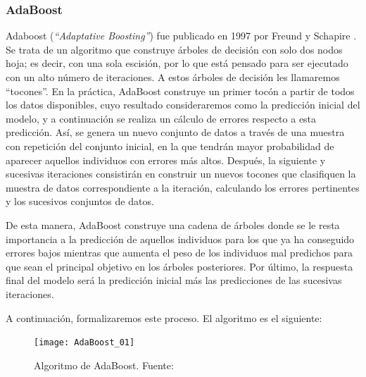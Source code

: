 \documentclass[12pt,twoside]{article}
\begin{document}
\subsubsection{AdaBoost} \label{sec:AdaBoost}
Adaboost (\textit{``Adaptative Boosting''}) fue publicado en 1997 por Freund y Schapire \cite{FR01}. Se trata de un algoritmo que construye árboles de decisión con solo dos nodos hoja; es decir, con una sola escisión, por lo que está pensado para ser ejecutado con un alto número de iteraciones. A estos árboles de decisión les llamaremos ``tocones''. En la práctica, AdaBoost construye un primer tocón a partir de todos los datos disponibles, cuyo resultado consideraremos como la predicción inicial del modelo, y a continuación se realiza un cálculo de errores respecto a esta predicción. Así, se genera un nuevo conjunto de datos a través de una muestra con repetición del conjunto inicial, en la que tendrán mayor probabilidad de aparecer aquellos individuos con errores más altos. Después, la siguiente y sucesivas iteraciones consistirán en construir un nuevos tocones que clasifiquen la muestra de datos correspondiente a la iteración, calculando los errores pertinentes y los sucesivos conjuntos de datos.

De esta manera, AdaBoost construye una cadena de árboles donde se le resta importancia a la predicción de aquellos individuos para los que ya ha conseguido errores bajos mientras que aumenta el peso de los individuos mal predichos para que sean el principal objetivo en los árboles posteriores. Por último, la respuesta final del modelo será la predicción inicial más las predicciones de las sucesivas iteraciones. 


A continuación, formalizaremos este proceso. El algoritmo es el siguiente:
\begin{figure}[h]
\centering
\texttt{[image: AdaBoost\_01]}
\caption{Algoritmo de AdaBoost. Fuente: \cite{FR04}}
\label{fig: AdaBoost_01}
\end{figure}
\end{document}
